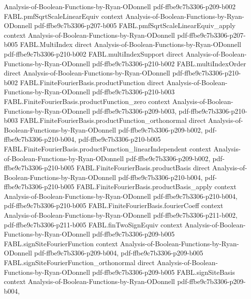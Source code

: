 \begin{theorem}
  {Analysis-of-Boolean-Functions-by-Ryan-ODonnell}
  {pdf-ffbe9c7b3306-p209-b002}
\proofstep
  {FABL.pmfSqrtScaleLinearEquiv}
  {context}
  {Analysis-of-Boolean-Functions-by-Ryan-ODonnell}
  {pdf-ffbe9c7b3306-p207-b005}
\proofstep
  {FABL.pmfSqrtScaleLinearEquiv_apply}
  {context}
  {Analysis-of-Boolean-Functions-by-Ryan-ODonnell}
  {pdf-ffbe9c7b3306-p207-b005}
\proofstep
  {FABL.MultiIndex}
  {direct}
  {Analysis-of-Boolean-Functions-by-Ryan-ODonnell}
  {pdf-ffbe9c7b3306-p210-b002}
\proofstep
  {FABL.multiIndexSupport}
  {direct}
  {Analysis-of-Boolean-Functions-by-Ryan-ODonnell}
  {pdf-ffbe9c7b3306-p210-b002}
\proofstep
  {FABL.multiIndexOrder}
  {direct}
  {Analysis-of-Boolean-Functions-by-Ryan-ODonnell}
  {pdf-ffbe9c7b3306-p210-b002}
\proofstep
  {FABL.FiniteFourierBasis.productFunction}
  {direct}
  {Analysis-of-Boolean-Functions-by-Ryan-ODonnell}
  {pdf-ffbe9c7b3306-p210-b003}
\proofstep
  {FABL.FiniteFourierBasis.productFunction_zero}
  {context}
  {Analysis-of-Boolean-Functions-by-Ryan-ODonnell}
  {pdf-ffbe9c7b3306-p209-b003,
    pdf-ffbe9c7b3306-p210-b003}
\proofstep
  {FABL.FiniteFourierBasis.productFunction_orthonormal}
  {direct}
  {Analysis-of-Boolean-Functions-by-Ryan-ODonnell}
  {pdf-ffbe9c7b3306-p209-b002,
    pdf-ffbe9c7b3306-p210-b004,
    pdf-ffbe9c7b3306-p210-b005}
\proofstep
  {FABL.FiniteFourierBasis.productFunction_linearIndependent}
  {context}
  {Analysis-of-Boolean-Functions-by-Ryan-ODonnell}
  {pdf-ffbe9c7b3306-p209-b002,
    pdf-ffbe9c7b3306-p210-b005}
\proofstep
  {FABL.FiniteFourierBasis.productBasis}
  {direct}
  {Analysis-of-Boolean-Functions-by-Ryan-ODonnell}
  {pdf-ffbe9c7b3306-p210-b004,
    pdf-ffbe9c7b3306-p210-b005}
\proofstep
  {FABL.FiniteFourierBasis.productBasis_apply}
  {context}
  {Analysis-of-Boolean-Functions-by-Ryan-ODonnell}
  {pdf-ffbe9c7b3306-p210-b004,
    pdf-ffbe9c7b3306-p210-b005}
\proofstep
  {FABL.FiniteFourierBasis.fourierCoeff}
  {context}
  {Analysis-of-Boolean-Functions-by-Ryan-ODonnell}
  {pdf-ffbe9c7b3306-p211-b002,
    pdf-ffbe9c7b3306-p211-b005}
\proofstep
  {FABL.finTwoSignEquiv}
  {context}
  {Analysis-of-Boolean-Functions-by-Ryan-ODonnell}
  {pdf-ffbe9c7b3306-p209-b005}
\proofstep
  {FABL.signSiteFourierFunction}
  {context}
  {Analysis-of-Boolean-Functions-by-Ryan-ODonnell}
  {pdf-ffbe9c7b3306-p209-b004,
    pdf-ffbe9c7b3306-p209-b005}
\proofstep
  {FABL.signSiteFourierFunction_orthonormal}
  {direct}
  {Analysis-of-Boolean-Functions-by-Ryan-ODonnell}
  {pdf-ffbe9c7b3306-p209-b005}
\proofstep
  {FABL.signSiteBasis}
  {context}
  {Analysis-of-Boolean-Functions-by-Ryan-ODonnell}
  {pdf-ffbe9c7b3306-p209-b004,
}
\end{theorem}
